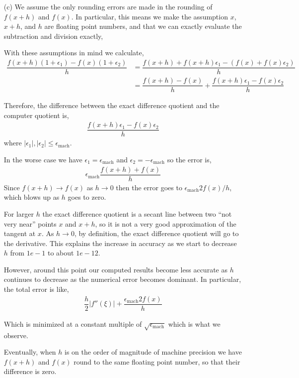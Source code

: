 \documentclass[10pt]{article}
\begin{document}
\begin{solution}[Solution]
\begin{enumerate}
    \item[(c)] We  assume the only rounding errors are made in the rounding of \( f(x+h) \) and \( f(x) \). In particular, this means we make the assumption \( x \), \( x+h \), and \( h \) are floating point numbers, and that we can exactly evaluate the subtraction and division exactly,

        With these assumptions in mind we calculate, 
        \begin{align*}
         \dfrac{f(x+h)(1+\epsilon_1)-f(x)(1+\epsilon_2)}{h} &= \dfrac{f(x+h) + f(x+h)\epsilon_1-(f(x)+f(x)\epsilon_2)}{h} \\
            &= \dfrac{f(x+h) - f(x)}{h} + \dfrac{f(x+h)\epsilon_1-f(x)\epsilon_2}{h} 
        \end{align*}
        
        Therefore, the difference between the exact difference quotient and the computer quotient is,
        \begin{align*}
            \dfrac{f(x+h)\epsilon_1-f(x)\epsilon_2}{h}
        \end{align*}
        where \( |\epsilon_1|, |\epsilon_2| \leq \epsilon_{\text{mach}} \).

        In the worse case we have \( \epsilon_1 = \epsilon_{\text{mach}} \) and \( \epsilon_2 = -\epsilon_{\text{mach}} \) so the error is,
        \begin{align*}
            \epsilon_{\text{mach}} \dfrac{f(x+h)+f(x)}{h}
        \end{align*}
        Since \( f(x+h)\to f(x) \) as \( h\to 0 \) then the error goes to \( \epsilon_\text{mach} 2f(x)/h \), which blows up as \( h \) goes to zero.



For larger \( h \) the exact difference quotient is a secant line between two ``not very near'' points \( x \) and \( x+h \), so it is not a very good approximation of the tangent at \( x \). As \( h\to 0 \), by definition, the exact difference quotient will go to the derivative. This explains the increase in accuracy as we start to decrease \( h \) from \( 1e-1 \) to about \( 1e-12 \).
        
        However, around this point our computed results become less accurate as \( h \) continues to decrease as the numerical error becomes dominant. In particular, the total error is like,
        \begin{align*}
            \dfrac{h}{2}|f''(\xi)| + \dfrac{\epsilon_{\text{mach}}2f(x)}{h}
        \end{align*}

        Which is minimized at a constant multiple of \( \sqrt{\epsilon_{\text{mach}}} \) which is what we observe.

        Eventually, when \( h \) is on the order of magnitude of machine precision we have \( f(x+h) \) and \( f(x) \) round to the same floating point number, so that their difference is zero.

\end{enumerate}
\end{solution}
\end{document}
